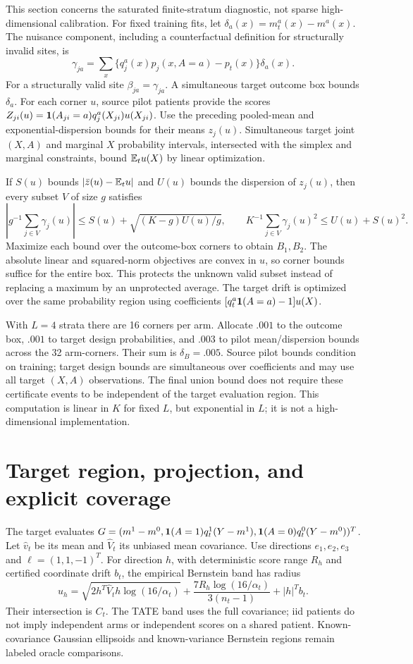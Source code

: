 This section concerns the saturated finite-stratum diagnostic, not sparse
high-dimensional calibration. For fixed training fits, let
$\delta_a(x)=m_t^a(x)-m^a(x)$. The nuisance component, including a
counterfactual definition for structurally invalid sites, is
\[
 \gamma_{ja}=\sum_x\{q_j^a(x)p_j(x,A=a)-p_t(x)\}\delta_a(x).
\]
For a structurally valid site $\beta_{ja}=\gamma_{ja}$.
A simultaneous target outcome box bounds $\delta_a$. For each corner $u$,
source pilot patients provide the scores
$Z_{ji}(u)=\mathbf 1(A_{ji}=a)q_j^a(X_{ji})u(X_{ji})$.
Use the preceding pooled-mean and exponential-dispersion bounds for their
means $z_j(u)$. Simultaneous target joint $(X,A)$ and marginal $X$
probability intervals, intersected with the simplex and marginal constraints,
bound $\mathbb E_tu(X)$ by linear optimization.

If $S(u)$ bounds $|\bar z(u)-\mathbb E_tu|$ and $U(u)$ bounds the dispersion of
$z_j(u)$, then every subset $V$ of size $g$ satisfies
\[
 |g^{-1}\sum_{j\in V}\gamma_j(u)|
 \le S(u)+\sqrt{(K-g)U(u)/g},\qquad
 K^{-1}\sum_{j\in V}\gamma_j(u)^2\le U(u)+S(u)^2.
\]
Maximize each bound over the outcome-box corners to obtain $B_1,B_2$.
The absolute linear and squared-norm objectives are convex in $u$, so
corner bounds suffice for the entire box. This protects the unknown valid
subset instead of replacing a maximum by an unprotected average.
The target drift is optimized over the same probability region using
coefficients $[q_t^a\mathbf 1(A=a)-1]u(X)$.

With $L=4$ strata there are 16 corners per arm. Allocate $.001$ to the
outcome box, $.001$ to target design probabilities, and $.003$ to pilot
mean/dispersion bounds across the 32 arm-corners. Their sum is
$\delta_B=.005$. Source pilot bounds condition on training; target design
bounds are simultaneous over coefficients and may use all target $(X,A)$
observations. The final union bound does not require these certificate
events to be independent of the target evaluation region.
This computation is linear in $K$ for fixed $L$, but exponential in $L$;
it is not a high-dimensional implementation.

\section{Target region, projection, and explicit coverage}

The target evaluates
$G=(m^1-m^0,\mathbf 1(A=1)q_t^1(Y-m^1),\mathbf 1(A=0)q_t^0(Y-m^0))^T$.
Let $\hat v_t$ be its mean and $\hat V_t$ its unbiased mean covariance.
Use directions $e_1,e_2,e_3$ and $\ell=(1,1,-1)^T$.
For direction $h$, with deterministic score range $R_h$ and certified
coordinate drift $b_t$, the empirical Bernstein band has radius
\[
 u_h=\sqrt{2h^T\hat V_th\log(16/\alpha_t)}
       +\frac{7R_h\log(16/\alpha_t)}{3(n_t-1)}+|h|^Tb_t.
\]
Their intersection is $C_t$. The TATE band uses the full covariance;
iid patients do not imply independent arms or independent scores on a
shared patient. Known-covariance Gaussian ellipsoids and known-variance
Bernstein regions remain labeled oracle comparisons.

